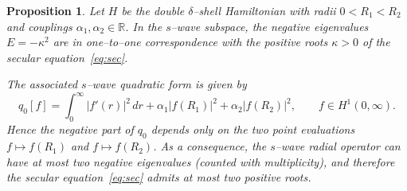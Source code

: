 \documentclass[a4paper,11pt]{article}
\numberwithin{equation}{section}
\newtheorem{prop}[thm]{Proposition}
\theoremstyle{definition}
\theoremstyle{remark}
\begin{document}
\begin{prop}\label{prop:neg-crit-corrected}
Let $H$ be the double $\delta$--shell Hamiltonian with radii $0<R_1<R_2$ and
couplings $\alpha_1,\alpha_2\in\mathbb R$.
In the $s$--wave subspace, the negative eigenvalues $E=-\kappa^2$ are in
one--to--one correspondence with the positive roots $\kappa>0$ of the secular
equation~\eqref{eq:sec}.

The associated $s$--wave quadratic form is given by
\[
q_0[f]
=
\int_0^\infty |f'(r)|^2\,dr
+\alpha_1|f(R_1)|^2+\alpha_2|f(R_2)|^2,
\qquad f\in H^1(0,\infty).
\]
Hence the negative part of $q_0$ depends only on the two point evaluations
$f\mapsto f(R_1)$ and $f\mapsto f(R_2)$.
As a consequence, the $s$--wave radial operator can have at most two negative
eigenvalues (counted with multiplicity), and therefore the secular
equation~\eqref{eq:sec} admits at most two positive roots.
\end{prop}
\end{document}
